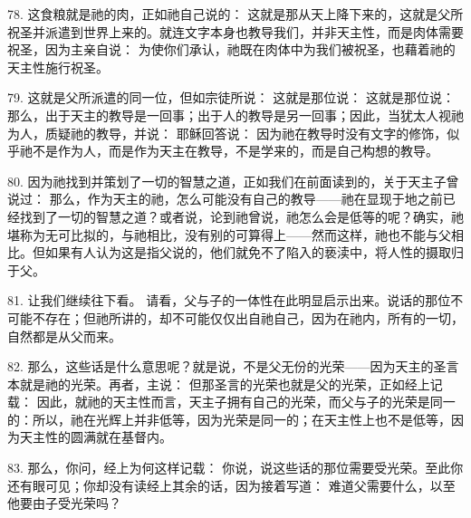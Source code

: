 78.  这食粮就是祂的肉，正如祂自己说的： 这就是那从天上降下来的，这就是父所祝圣并派遣到世界上来的。就连文字本身也教导我们，并非天主性，而是肉体需要祝圣，因为主亲自说： 为使你们承认，祂既在肉体中为我们被祝圣，也藉着祂的天主性施行祝圣。\par

79. 这就是父所派遣的同一位，但如宗徒所说： 这就是那位说： 这就是那位说： 那么，出于天主的教导是一回事；出于人的教导是另一回事；因此，当犹太人视祂为人，质疑祂的教导，并说： 耶稣回答说： 因为祂在教导时没有文字的修饰，似乎祂不是作为人，而是作为天主在教导，不是学来的，而是自己构想的教导。\par

80. 因为祂找到并策划了一切的智慧之道，正如我们在前面读到的，关于天主子曾说过： 那么，作为天主的祂，怎么可能没有自己的教导——祂在显现于地之前已经找到了一切的智慧之道？或者说，论到祂曾说，祂怎么会是低等的呢？确实，祂堪称为无可比拟的，与祂相比，没有别的可算得上——然而这样，祂也不能与父相比。但如果有人认为这是指父说的，他们就免不了陷入的亵渎中，将人性的摄取归于父。\par

81. 让我们继续往下看。 请看，父与子的一体性在此明显启示出来。说话的那位不可能不存在；但祂所讲的，却不可能仅仅出自祂自己，因为在祂内，所有的一切，自然都是从父而来。\par

82. 那么，这些话是什么意思呢？就是说，不是父无份的光荣——因为天主的圣言本就是祂的光荣。再者，主说： 但那圣言的光荣也就是父的光荣，正如经上记载： 因此，就祂的天主性而言，天主子拥有自己的光荣，而父与子的光荣是同一的：所以，祂在光辉上并非低等，因为光荣是同一的；在天主性上也不是低等，因为天主性的圆满就在基督内。\par

83. 那么，你问，经上为何这样记载：  你说，说这些话的那位需要受光荣。至此你还有眼可见；你却没有读经上其余的话，因为接着写道： 难道父需要什么，以至他要由子受光荣吗？\par

